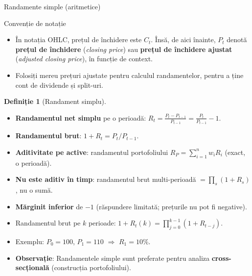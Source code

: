 \documentclass[9pt, aspectratio=169, t]{beamer}
\theoremstyle{definition}
\newtheorem{defn}{Definiție}
\begin{document}
\begin{frame}[shrink=8]{Randamente simple (aritmetice)}
\begin{alertblock}{Convenție de notație}
\begin{itemize}\small\setlength{\itemsep}{0pt}
    \item În notația OHLC, prețul de închidere este $C_t$. Însă, de aici înainte, $P_t$ denotă \textbf{prețul de închidere} (\textit{closing price}) sau \textbf{prețul de închidere ajustat} (\textit{adjusted closing price}), în funcție de context.
    \item Folosiți mereu prețuri ajustate pentru calculul randamentelor, pentru a ține cont de dividende și split-uri.
\end{itemize}
\end{alertblock}
\begin{defn}[Randament simplu]
\begin{itemize}\setlength{\itemsep}{1pt}
    \item \textbf{Randamentul net simplu} pe o perioadă:
    $R_t = \frac{P_t - P_{t-1}}{P_{t-1}} = \frac{P_t}{P_{t-1}} - 1.$
    \item \textbf{Randamentul brut}: $1 + R_t = P_t / P_{t-1}$.
\end{itemize}
\end{defn}
\vspace{0.1cm}
\begin{itemize}
    \item \textbf{Aditivitate pe active}: randamentul portofoliului $R_P = \sum_{i=1}^n w_i R_i$ (exact, o perioadă).
    \item \textbf{Nu este aditiv în timp}: randamentul brut multi-perioadă $= \prod_{s}(1+R_s)$, nu o sumă.
    \item \textbf{Mărginit inferior} de $-1$ (răspundere limitată; prețurile nu pot fi negative).
    \item Randamentul brut pe $k$ perioade: $1 + R_t(k) = \prod_{j=0}^{k-1}(1 + R_{t-j})$.
    \item Exemplu: $P_0=100$, $P_1=110$ $\Rightarrow$ $R_1 = 10\%$.
\end{itemize}
\vspace{0.05cm}
\begin{itemize}
    \item \textbf{Observație}: Randamentele simple sunt preferate pentru analiza \textbf{cross-secțională} (construcția portofoliului).
\end{itemize}
\end{frame}
\end{document}
